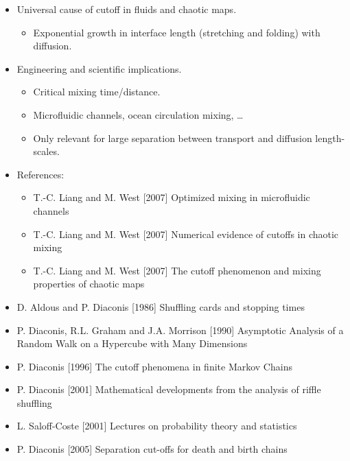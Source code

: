 \documentclass[12pt,t]{beamer}
\begin{document}
\begin{frame}
  \begin{itemize}
  \item Universal cause of cutoff in fluids and chaotic maps.
    \begin{itemize}
    \item Exponential growth in interface length (stretching and
      folding) with diffusion.
    \end{itemize}
  \item Engineering and scientific implications.
    \begin{itemize}
    \item Critical mixing time/distance.
    \item Microfluidic channels, ocean circulation mixing, \ldots
    \item Only relevant for large separation between transport and
      diffusion length-scales.
    \end{itemize}
  \item References:
    \begin{itemize}
    \item T.-C. Liang and M. West [2007] Optimized mixing in
      microfluidic channels
    \item T.-C. Liang and M. West [2007] Numerical evidence of cutoffs
      in chaotic mixing
    \item T.-C. Liang and M. West [2007] The cutoff phenomenon and
      mixing properties of chaotic maps
    \end{itemize}
  \end{itemize}
\end{frame}
\begin{frame}
  \begin{itemize}
  \item D. Aldous and P. Diaconis [1986] Shuffling cards and stopping
    times
  \item P. Diaconis, R.L. Graham and J.A. Morrison [1990] Asymptotic
    Analysis of a Random Walk on a Hypercube with Many Dimensions
  \item P. Diaconis [1996] The cutoff phenomena in finite Markov
    Chains
  \item P. Diaconis [2001] Mathematical developments from the analysis
    of riffle shuffling
  \item L. Saloff-Coste [2001] Lectures on probability theory and statistics
  \item P.  Diaconis [2005] Separation cut-offs for death and birth
    chains
  \end{itemize}
\end{frame}
\end{document}
